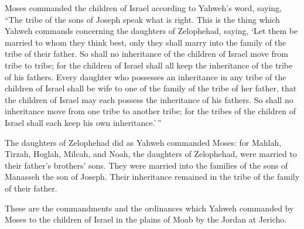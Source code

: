  Moses commanded the children of Israel according to
Yahweh's word, saying, ``The tribe of the sons of Joseph speak what is
right.  This is the thing which Yahweh commands concerning
the daughters of Zelophehad, saying, `Let them be married to whom they
think best, only they shall marry into the family of the tribe of their
father.  So shall no inheritance of the children of Israel
move from tribe to tribe; for the children of Israel shall all keep the
inheritance of the tribe of his fathers.  Every daughter
who possesses an inheritance in any tribe of the children of Israel
shall be wife to one of the family of the tribe of her father, that the
children of Israel may each possess the inheritance of his fathers.
 So shall no inheritance move from one tribe to another
tribe; for the tribes of the children of Israel shall each keep his own
inheritance.'\,''

 The daughters of Zelophehad did as Yahweh commanded
Moses:  for Mahlah, Tirzah, Hoglah, Milcah, and Noah, the
daughters of Zelophehad, were married to their father's brothers' sons.
 They were married into the families of the sons of
Manasseh the son of Joseph. Their inheritance remained in the tribe of
the family of their father.

 These are the commandments and the ordinances which
Yahweh commanded by Moses to the children of Israel in the plains of
Moab by the Jordan at Jericho.
